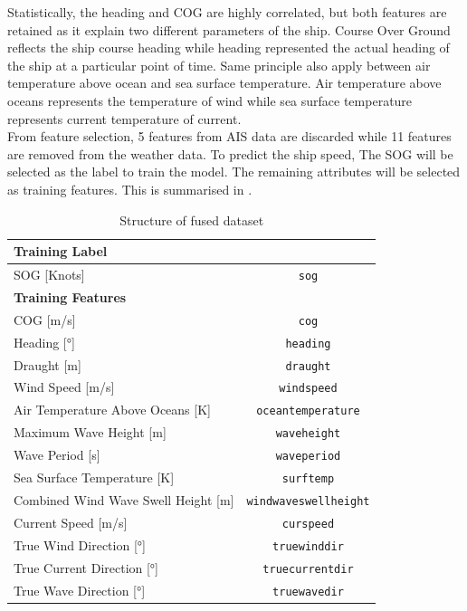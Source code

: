 Statistically, the heading and COG are highly correlated, but both features are retained as it explain two different parameters of the ship. Course Over Ground reflects the ship course heading while heading represented the actual heading of the ship at a particular point of time. Same principle also apply between air temperature above ocean and sea surface temperature. Air temperature above oceans represents the temperature of wind while sea surface temperature represents current temperature of current.\\

From feature selection, 5 features from AIS data are discarded while 11 features are removed from the weather data. To predict the ship speed, The SOG will be selected as the label to train the model. The remaining attributes will be selected as training features. This is summarised in .
\begin{table}
    \centering
    {\begin{tabular}{ |p{8cm}|c| }
    \hline
    \multicolumn{2}{|l|}{\textbf{Training Label}}\\
    \hline
    SOG [Knots] & {\tt sog} \\
    \hline
    \multicolumn{2}{|l|}{\textbf{Training Features}}\\
    \hline
    COG [m/s] & {\tt cog}  \\
    \hline
    Heading [°] & {\tt heading}  \\
    \hline
    Draught [m] & {\tt draught} \\
    \hline
    Wind Speed [m/s] & {\tt windspeed} \\
    \hline
    Air Temperature Above Oceans [K] & {\tt oceantemperature} \\
    \hline
    Maximum Wave Height [m] & {\tt waveheight} \\
    \hline
    Wave Period [s] & {\tt waveperiod}\\
    \hline
    Sea Surface Temperature [K] & {\tt surftemp}\\
    \hline
    Combined Wind Wave Swell Height [m] &  {\tt windwaveswellheight} \\
    \hline
    Current Speed [m/s] & {\tt curspeed} \\
    \hline
    True Wind Direction [°] & {\tt truewinddir}  \\
    \hline
    True Current Direction [°] & {\tt truecurrentdir} \\
    \hline
    True Wave Direction [°] & {\tt truewavedir} \\
    \hline
    \end{tabular}}
\caption{Structure of fused dataset}\label{dataset_train_struct}
\end{table}

